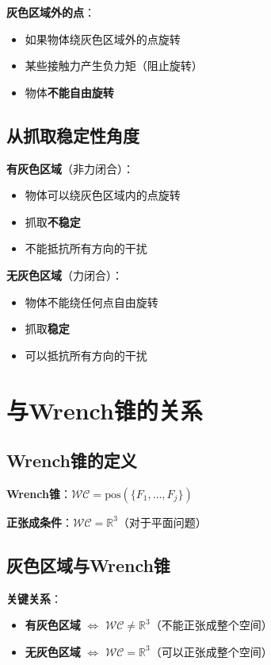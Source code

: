 \documentclass[12pt,a4paper]{article}
\begin{document}
\textbf{灰色区域外的点}：
\begin{itemize}
\item 如果物体绕灰色区域外的点旋转
\item 某些接触力产生负力矩（阻止旋转）
\item 物体\textbf{不能自由旋转}
\end{itemize}

\subsection{从抓取稳定性角度}

\textbf{有灰色区域}（非力闭合）：
\begin{itemize}
\item 物体可以绕灰色区域内的点旋转
\item 抓取\textbf{不稳定}
\item 不能抵抗所有方向的干扰
\end{itemize}

\textbf{无灰色区域}（力闭合）：
\begin{itemize}
\item 物体不能绕任何点自由旋转
\item 抓取\textbf{稳定}
\item 可以抵抗所有方向的干扰
\end{itemize}

\section{与Wrench锥的关系}

\subsection{Wrench锥的定义}

\textbf{Wrench锥}：$\mathcal{WC} = \text{pos}(\{F_1, \ldots, F_j\})$

\textbf{正张成条件}：$\mathcal{WC} = \mathbb{R}^3$（对于平面问题）

\subsection{灰色区域与Wrench锥}

\textbf{关键关系}：
\begin{itemize}
\item \textbf{有灰色区域} $\Leftrightarrow$ $\mathcal{WC} \neq \mathbb{R}^3$（不能正张成整个空间）
\item \textbf{无灰色区域} $\Leftrightarrow$ $\mathcal{WC} = \mathbb{R}^3$（可以正张成整个空间）
\end{itemize}
\end{document}
